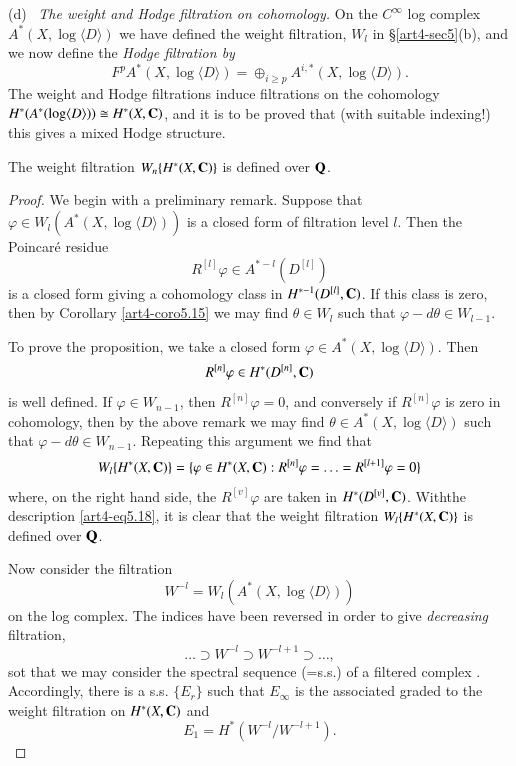 \medskip
(d)~ \textit{The weight and Hodge filtration on cohomology.} On the $C^\infty$ log complex $A^\ast (X, \log \langle D \rangle)$ we have defined the weight filtration, $W_l$ in \S \ref{art4-sec5}(b), and we now define the \textit{Hodge filtration by}
\setcounter{equation}{15}
\begin{equation}
F^p A^{\ast} (X, \log \langle D \rangle) = \oplus_{i \geqslant p} A^{i,\ast} (X, \log \langle D \rangle) .
\label{art4-eq5.16}
\end{equation}
The weight and Hodge filtrations induce filtrations on the cohomology $H^\ast (A^\ast (\log \langle D \rangle)) \cong H^\ast (X, \mathbf{C})$, and it is to be proved that (with suitable indexing!) this gives a mixed Hodge structure.

\setcounter{proposition}{16}
\begin{proposition}\label{art4-prop5.17}
The weight filtration $W_n \{H^\ast (X, \mathbf{C})\}$ is defined over $\mathbf{Q}$.
\end{proposition}

\begin{proof}
We begin with a preliminary remark. Suppose that $\varphi \in W_l (A^\ast (X, \log \langle D \rangle))$ is a closed form of filtration level $l$. Then the Poincar\'e residue
$$
R^{[l]} \varphi \in A^{\ast -l} (D^{[l]})
$$
is a closed form giving a cohomology class in $H^{\ast-1} (D^{[l]}, \mathbf{C})$. If this class is zero, then by Corollary \ref{art4-coro5.15} we may find $\theta \in W_l$ such that $\varphi -d \theta \in W_{l-1}$.

To prove the proposition, we take a closed form $\varphi\in A^{\ast} (X, \log \langle D \rangle)$. Then
$$
R^{[n]} \varphi \in H^\ast (D^{[n]} , \mathbf{C})
$$
is well defined. If $\varphi \in W_{n-1}$, then $R^{[n]} \varphi =0$, and conversely if $R^{[n]} \varphi$ is zero in cohomology, then by the above remark we may find $\theta \in A^\ast (X, \log \langle D \rangle)$ such that $\varphi - d \theta \in W_{n-1}$. Repeating this argument we find that 
\setcounter{equation}{17}
\begin{equation}
W_l \{H^\ast (X,\mathbf{C})\} = \{\varphi \in H^\ast (X, \mathbf{C}): R^{[n]} \varphi = \ldots = R^{[l+1]} \varphi =0\} \label{art4-eq5.18}
\end{equation} 
where, on the right hand side, the $R^{[v]}\varphi$ are taken in $H^\ast (D^{[v]}, \mathbf{C})$. With\pageoriginale the description \eqref{art4-eq5.18}, it is clear that the weight filtration $W_l \{H^\ast (X, \mathbf{C})\}$ is defined over $\mathbf{Q}$.

Now consider the filtration
\begin{equation}
W^{-l} = W_l (A^\ast (X, \log \langle D \rangle))
\label{art4-eq5.19}
\end{equation}
on the log complex. The indices have been reversed in order to give \textit{decreasing} filtration,
$$
\ldots \supset W^{-l} \supset W^{-l+1} \supset \ldots,
$$
sot that we may consider the spectral sequence (=s.s.) of a filtered complex \cite{art4-key17}. Accordingly, there is a s.s. $\{E_r\}$ such that $E_\infty$ is the associated graded to the weight filtration on $H^\ast (X, \mathbf{C})$ and 
$$
E_1 = H^\ast (W^{-l}/ W^{-l+1}).
$$
\end{proof}

